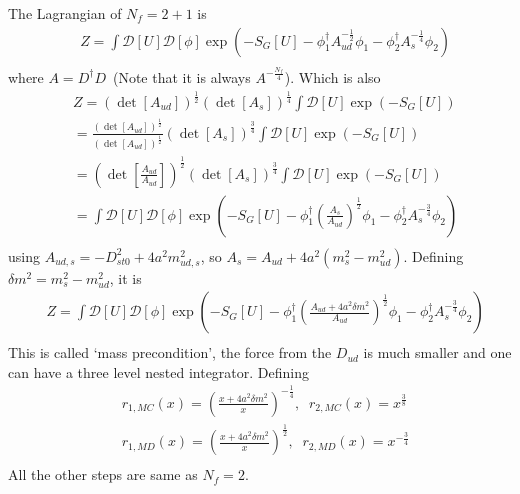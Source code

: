 The Lagrangian of $N_f=2+1$ is
\begin{equation}
\begin{split}
&Z=\int \mathcal{D}[U]  \mathcal {D}[\phi]\exp \left(-S_G[U]-\phi _1^{\dagger} A_{ud}^{-\frac{1}{2}} \phi _1 -\phi _2 ^{\dagger} A_s^{-\frac{1}{4}} \phi _2\right)\\
\end{split}
\end{equation}
where $A=D^{\dagger}D$~(Note that it is always $A^{-\frac{N_f}{4}}$). Which is also
\begin{equation}
\begin{split}
&Z= \left(\det \left[A_{ud}\right]\right)^{\frac{1}{2}}\left(\det \left[A_{s}\right]\right)^{\frac{1}{4}}\int \mathcal{D}[U]  \exp \left(-S_G[U]\right)\\
& = \frac{\left(\det \left[A_{ud}\right]\right)^{\frac{1}{2}}}{\left(\det \left[A_{ud}\right]\right)^{\frac{1}{2}}}\left(\det \left[A_{s}\right]\right)^{\frac{3}{4}}\int \mathcal{D}[U]  \exp \left(-S_G[U]\right)\\
& = \left(\det \left[\frac{A_{ud}}{A_{ud}}\right]\right)^{\frac{1}{2}}\left(\det \left[A_{s}\right]\right)^{\frac{3}{4}}\int \mathcal{D}[U]  \exp \left(-S_G[U]\right)\\
&=\int \mathcal{D}[U]  \mathcal {D}[\phi]\exp \left(-S_G[U]-\phi _1^{\dagger} \left(\frac{A_{s}}{A_{ud}}\right)^{\frac{1}{2}} \phi _1 -\phi _2 ^{\dagger} A_s^{-\frac{3}{4}} \phi _2\right)\\
\end{split}
\end{equation}
using $A_{ud,s}=-D_{st0}^2+4a^2m_{ud,s}^2$, so $A_s=A_{ud}+4a^2(m_s^2-m_{ud}^2)$. Defining $\delta m^2 = m_s^2-m_{ud}^2$, it is
\begin{equation}
\begin{split}
&Z= \int \mathcal{D}[U]  \mathcal {D}[\phi]\exp \left(-S_G[U]-\phi _1^{\dagger} \left(\frac{A_{ud}+4a^2\delta m^2}{A_{ud}}\right)^{\frac{1}{2}} \phi _1 -\phi _2 ^{\dagger} A_s^{-\frac{3}{4}} \phi _2\right)\\
\end{split}
\end{equation}
This is called `mass precondition', the force from the $D_{ud}$ is much smaller and one can have a three level nested integrator. Defining
\begin{equation}
\begin{split}
&r_{1,MC}(x) =  \left(\frac{x+4a^2\delta m^2}{x}\right)^{-\frac{1}{4}},\;\;r_{2,MC}(x)=  x^{\frac{3}{8}}\\
&r_{1,MD}(x) =  \left(\frac{x+4a^2\delta m^2}{x}\right)^{\frac{1}{2}},\;\;r_{2,MD}(x)=  x^{-\frac{3}{4}}\\
\end{split}
\end{equation}
All the other steps are same as $N_f=2$.

